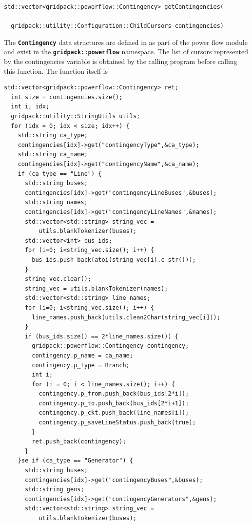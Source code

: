 \documentclass[12pt]{report} %
\begin{document}
{
\color{red}
\begin{Verbatim}[fontseries=b]
std::vector<gridpack::powerflow::Contingency> getContingencies(

  gridpack::utility::Configuration::ChildCursors contingencies)
\end{Verbatim}
}

The \texttt{\textbf{Contingency}} data structures are defined in as part of the power flow module and exist in the \texttt{\textbf{gridpack::powerflow}} namespace. The list of cursors represented by the contingencies variable is obtained by the calling program before calling this function. The function itself is

{
\color{red}
\begin{Verbatim}[fontseries=b]
  std::vector<gridpack::powerflow::Contingency> ret;
  int size = contingencies.size();
  int i, idx;
  gridpack::utility::StringUtils utils;
  for (idx = 0; idx < size; idx++) {
    std::string ca_type;
    contingencies[idx]->get("contingencyType",&ca_type);
    std::string ca_name;
    contingencies[idx]->get("contingencyName",&ca_name);
    if (ca_type == "Line") {
      std::string buses;
      contingencies[idx]->get("contingencyLineBuses",&buses);
      std::string names;
      contingencies[idx]->get("contingencyLineNames",&names);
      std::vector<std::string> string_vec = 
          utils.blankTokenizer(buses);
      std::vector<int> bus_ids;
      for (i=0; i<string_vec.size(); i++) {
        bus_ids.push_back(atoi(string_vec[i].c_str()));
      }
      string_vec.clear();
      string_vec = utils.blankTokenizer(names);
      std::vector<std::string> line_names;
      for (i=0; i<string_vec.size(); i++) {
        line_names.push_back(utils.clean2Char(string_vec[i]));
      }
      if (bus_ids.size() == 2*line_names.size()) {
        gridpack::powerflow::Contingency contingency;
        contingency.p_name = ca_name;
        contingency.p_type = Branch;
        int i;
        for (i = 0; i < line_names.size(); i++) {
          contingency.p_from.push_back(bus_ids[2*i]);
          contingency.p_to.push_back(bus_ids[2*i+1]);
          contingency.p_ckt.push_back(line_names[i]);
          contingency.p_saveLineStatus.push_back(true);
        }
        ret.push_back(contingency);
      }
    }se if (ca_type == "Generator") {
      std::string buses;
      contingencies[idx]->get("contingencyBuses",&buses);
      std::string gens;
      contingencies[idx]->get("contingencyGenerators",&gens);
      std::vector<std::string> string_vec =
          utils.blankTokenizer(buses);

\end{Verbatim}}
\end{document}
